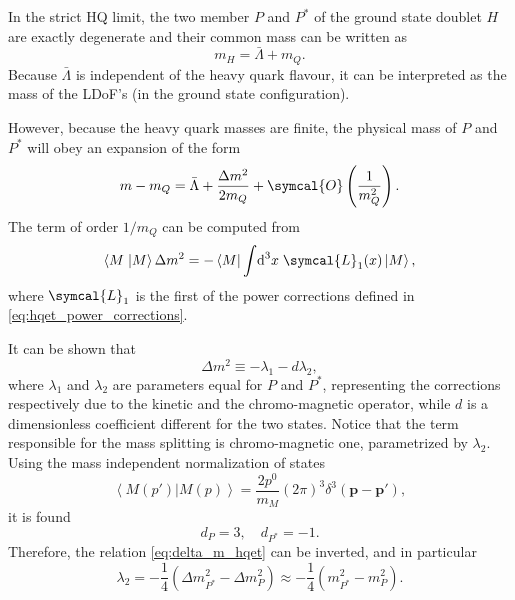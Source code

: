 In the strict HQ limit, the two member $P$ and $P^*$ of the ground state doublet $H$ are exactly degenerate and their common mass can be written as
\begin{equation}
  m_H = \bar{\Lambda} + m_Q .
\end{equation}
Because $\bar{\Lambda}$ is independent of the heavy quark flavour, it can be interpreted as the mass of the LDoF's (in the ground state configuration). 

However, because the heavy quark masses are finite, the physical mass of $P$ and $P^*$ will obey an expansion of the form
\begin{equation}
  m - m_Q = \bar{\Lambda} + \frac{\Delta m^2}{2 m_Q} + \symcal{O}\left( \frac{1}{m^2_Q} \right) .
\end{equation}
The term of order $1/m_Q$ can be computed from
\begin{equation}
  \left\langle M \right. \left\vert M \right\rangle \Delta m^2 = - \left\langle M \right\vert \int \! \D^3 \! x \; \symcal{L}_1 (x) \left\vert M \right\rangle ,
\end{equation}
where $\symcal{L}_1$ is the first of the power corrections defined in \eqref{eq:hqet_power_corrections}. 

It can be shown that 
\begin{equation}
  \Delta m^2 \equiv - \lambda_1 - d \lambda_2 ,
  \label{eq:delta_m_hqet}
\end{equation}
where $\lambda_1$ and $\lambda_2$ are parameters equal for $P$ and $P^*$, representing the corrections respectively due to the kinetic and the chromo-magnetic operator, while $d$ is a dimensionless coefficient different for the two states. Notice that the term responsible for the mass splitting is chromo-magnetic one, parametrized by $\lambda_2$. Using the mass independent normalization of states
\begin{equation}
  \left\langle M (p') \right. \left\vert M(p) \right\rangle = \frac{2 p^0}{m_M} \left( 2 \pi \right)^3 \delta^3 \left( \symbf{p} - \symbf{p}' \right) ,
\end{equation}
it is found
\begin{equation}
  d_P = 3 , \quad d_{P^*} = -1 .
\end{equation}
Therefore, the relation \eqref{eq:delta_m_hqet} can be inverted, and in particular
\begin{equation}
  \lambda_2 = - \frac{1}{4} \left( \Delta m^2_{P^*} - \Delta m^2_P \right) \approx - \frac{1}{4} \left( m^2_{P^*} - m^2_P \right) .
\end{equation}

